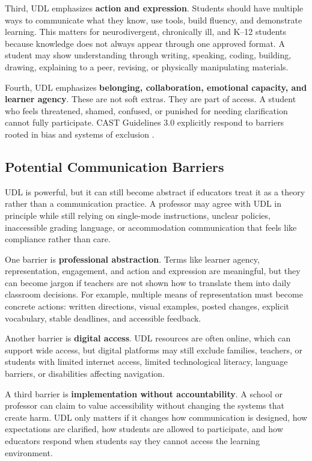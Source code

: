 \documentclass[12pt]{article}
\begin{document}
Third, UDL emphasizes \textbf{action and expression}. Students should have multiple ways to communicate what they know, use tools, build fluency, and demonstrate learning. This matters for neurodivergent, chronically ill, and K--12 students because knowledge does not always appear through one approved format. A student may show understanding through writing, speaking, coding, building, drawing, explaining to a peer, revising, or physically manipulating materials.

Fourth, UDL emphasizes \textbf{belonging, collaboration, emotional capacity, and learner agency}. These are not soft extras. They are part of access. A student who feels threatened, shamed, confused, or punished for needing clarification cannot fully participate. CAST Guidelines 3.0 explicitly respond to barriers rooted in bias and systems of exclusion \citep{cast2024udl}.

\subsection*{Potential Communication Barriers}

UDL is powerful, but it can still become abstract if educators treat it as a theory rather than a communication practice. A professor may agree with UDL in principle while still relying on single-mode instructions, unclear policies, inaccessible grading language, or accommodation communication that feels like compliance rather than care.

One barrier is \textbf{professional abstraction}. Terms like learner agency, representation, engagement, and action and expression are meaningful, but they can become jargon if teachers are not shown how to translate them into daily classroom decisions. For example, multiple means of representation must become concrete actions: written directions, visual examples, posted changes, explicit vocabulary, stable deadlines, and accessible feedback.

Another barrier is \textbf{digital access}. UDL resources are often online, which can support wide access, but digital platforms may still exclude families, teachers, or students with limited internet access, limited technological literacy, language barriers, or disabilities affecting navigation.

A third barrier is \textbf{implementation without accountability}. A school or professor can claim to value accessibility without changing the systems that create harm. UDL only matters if it changes how communication is designed, how expectations are clarified, how students are allowed to participate, and how educators respond when students say they cannot access the learning environment.
\end{document}
